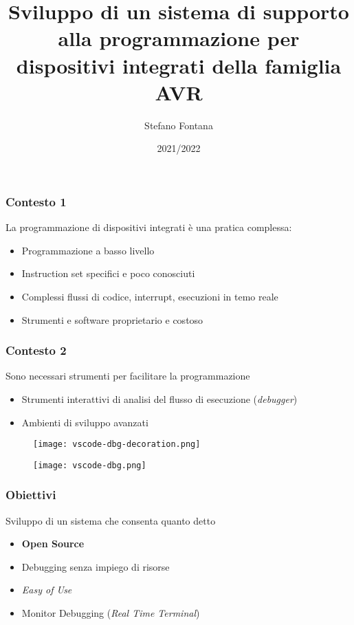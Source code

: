 \documentclass[aspectratio=169,
]{beamer}
\title[Relazione Finale]{Sviluppo di un sistema di supporto alla programmazione per dispositivi integrati della famiglia AVR}
\author[S.Fontana --- 727199]{Stefano Fontana}
\date{2021/2022}
\begin{document}
    \maketitle

    \begin{frame}
        \frametitle{Contesto \hfill 1}
    
        La programmazione di dispositivi integrati è una pratica complessa:

        \begin{itemize}
            \item <1-> Programmazione a basso livello
            \item <2-> Instruction set specifici e poco conosciuti
            \item <3-> Complessi flussi di codice, interrupt, esecuzioni in temo reale
            \item <4-> Strumenti e software proprietario e costoso
        \end{itemize}
        
    \end{frame}

    \begin{frame}
        \frametitle{Contesto \hfill 2}
    
        Sono necessari strumenti per facilitare la programmazione
        \begin{itemize}
            \item <1-> Strumenti interattivi di analisi del flusso di esecuzione (\textit{debugger})
            \item <2-> Ambienti di sviluppo avanzati
        \end{itemize}

        \begin{figure}
            \hfill
            \begin{minipage}{.45\textwidth}
                \texttt{[image: vscode-dbg-decoration.png]}
            \end{minipage}
            \hfill
            \begin{minipage}{.45\textwidth}
                \texttt{[image: vscode-dbg.png]}
            \end{minipage}
        \end{figure}
    \end{frame}

    \begin{frame}
        \frametitle{Obiettivi}
        
        Sviluppo di un sistema che consenta quanto detto
        \begin{itemize}
            \item <1-> \textbf{Open Source}
            \item <2-> Debugging senza impiego di risorse
            \item <3-> \textit{Easy of Use}
            \item <4-> Monitor Debugging (\textit{Real Time Terminal})
        \end{itemize}
    \end{frame}
\end{document}
